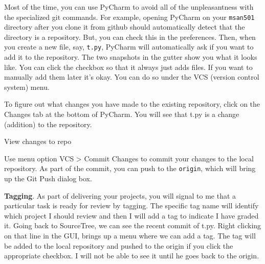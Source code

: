 Most of the time, you can use PyCharm to avoid all of the unpleasantness with the specialized git commands. For example, opening PyCharm on your {\tt msan501} directory after you clone it from github should automatically detect that the directory is a repository. But, you can check this in the preferences. Then, when you create a new file, say, {\tt t.py}, PyCharm will automatically ask if you want to add it to the repository. The two snapshots in the gutter show you what it looks like. You can click the checkbox so that it always just adds files. If you want to manually add them later it's okay. You can do so under the VCS (version control system) menu.

To figure out what changes you have made to the existing repository, click on the Changes tab at the bottom of PyCharm. You will see that t.py is a change (addition) to the repository.

\begin{marginfigure}
\begin{center}
\end{center}
\caption{View changes to repo}
\end{marginfigure}

Use menu option VCS > Commit Changes to commit your changes to the local repository.   As part of the commit, you can push to the {\tt origin}, which will bring up the Git Push dialog box.
\vspace{5mm}

{\bf Tagging}.  As part of delivering your projects, you will signal to me that a particular task is ready for review by tagging. The specific tag name will identify which project I should review and then I will add a tag to indicate I have graded it.  Going back to SourceTree, we can see the recent commit of t.py. Right clicking on that line in the GUI, brings up a menu where we can add a tag. The tag will be added to the local repository and pushed to the origin if you click the appropriate checkbox. I will not be able to see it until he goes back to the origin.

